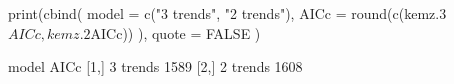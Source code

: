 \begin{Schunk}
\begin{Sinput}
 print(cbind(
   model = c("3 trends", "2 trends"),
   AICc = round(c(kemz.3$AICc, kemz.2$AICc))
 ),
 quote = FALSE
 )
\end{Sinput}
\begin{Soutput}
     model    AICc
[1,] 3 trends 1589
[2,] 2 trends 1608
\end{Soutput}
\end{Schunk}

